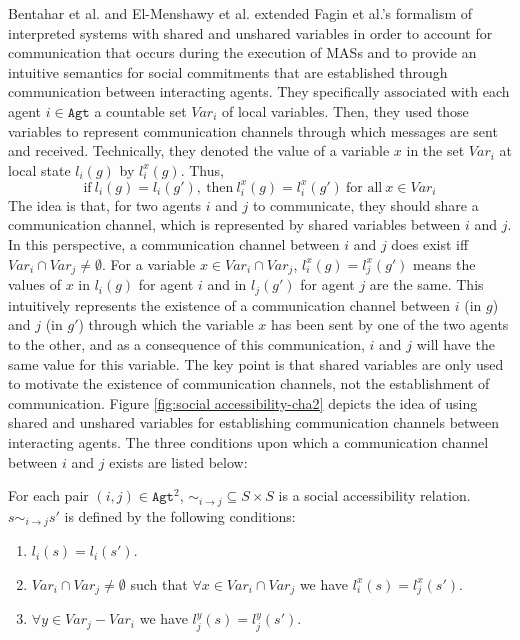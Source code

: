 Bentahar et al. \cite{Bentahar2012} and El-Menshawy et al. \cite{El-Menshawy2013a} extended Fagin et al.'s formalism of interpreted systems with shared and unshared variables in order to account for communication that occurs during the execution of MASs and to provide an intuitive semantics for social commitments that are established through communication between interacting agents. They specifically associated with each agent $i\in \texttt{Agt}$ a countable set $Var_i$ of local
variables. Then, they used those variables to represent
communication channels through which messages are sent and
received. Technically, they denoted the value of a variable $x$ in
the set $Var_i$ at local state $l_i(g)$ by $l^{x}_i(g)$. Thus,
%
\begin{equation}
\textrm{if}~ l_i(g)=l_i(g'),~\textrm{then}~ l^{x}_i(g)
=l^{x}_i(g')~ \textrm{for~all}~ x \in Var_i
\end{equation}
%
The idea is that, for two agents $i$ and $j$ to communicate, they
should share a communication channel, which is represented by
shared variables between $i$ and $j$. In this perspective, a
communication channel between $i$ and $j$ does exist iff $Var_i
\cap Var_j \neq\emptyset$. For a variable $x \in Var_i \cap
Var_j$, $l^{x}_i(g)=l^{x}_j(g')$ means the values of $x$ in
$l_i(g)$ for agent $i$ and in $l_j(g')$ for agent $j$ are the same. This
intuitively represents the existence of a communication channel
between $i$ (in $g$) and $j$ (in $g'$) through which the variable
$x$ has been sent by one of the two agents to the other, and as a
consequence of this communication, $i$ and $j$ will have the same
value for this variable. The key point is that shared variables
are only used to motivate the existence of communication channels,
not the establishment of communication. Figure \ref{fig:social accessibility-cha2} depicts the idea of using shared and unshared variables for establishing communication channels between interacting agents.
The three conditions upon which a communication channel between $i$ and $j$ exists are listed below:

For each pair $(i,j) \in \texttt{Agt}^2$, $\sim_{i\rightarrow j} \subseteq S \times S$ is a social accessibility relation. $s \sim_{i\rightarrow j} s'$ is defined by the following conditions:
  \begin{enumerate}
       \item $l_i(s)=l_i(s')$.
       \item $Var_i \cap Var_j \neq \emptyset$ such that $\forall x \in Var_i \cap Var_j$ we have $l^{x}_i(s)\!=\!l^{x}_j(s')$.
       \item $\forall y \in Var_j\!-\! Var_i$ we have $l^{y}_j(s)\!=\!l^{y}_j(s')$.
  \end{enumerate}

